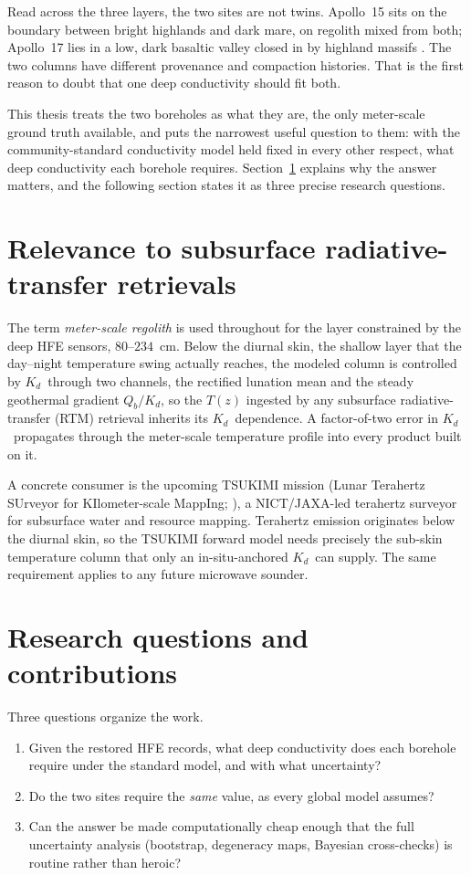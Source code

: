 \documentclass[11pt,a4paper,oneside]{report}
\newcommand{\Kd}{\ensuremath{K_d}}
\newcommand{\Qb}{\ensuremath{Q_b}}
\begin{document}
Read across the three layers, the two sites are not twins. Apollo~15
sits on the boundary between bright highlands and dark mare, on
regolith mixed from both; Apollo~17 lies in a low, dark basaltic
valley closed in by highland massifs
\citep{korotev2005,wieczorek2006,crawford2015}. The two columns have
different provenance and compaction histories. That is the first
reason to doubt that one deep conductivity should fit both.

This thesis treats the two boreholes as what they are, the only
meter-scale ground truth available, and puts the narrowest useful
question to them: with the community-standard conductivity model held
fixed in every other respect, what deep conductivity each borehole
requires. Section~\ref{sec:intro-tsukimi} explains why the answer
matters, and the following section states it as three precise
research questions.

\section{Relevance to subsurface radiative-transfer retrievals}\label{sec:intro-tsukimi}
The term \emph{meter-scale regolith} is used throughout for the layer
constrained by the deep HFE sensors, $80$--$234$~cm. Below the diurnal
skin, the shallow layer that the day--night temperature swing actually
reaches, the modeled column is controlled by \Kd\ through two channels,
the rectified lunation mean and the steady geothermal gradient
$\Qb/\Kd$, so the $T(z)$ ingested by any subsurface
radiative-transfer (RTM) retrieval inherits its \Kd\ dependence. A
factor-of-two error in \Kd\ propagates through the meter-scale
temperature profile into every product built on it.

A concrete consumer is the upcoming TSUKIMI mission (Lunar Terahertz
SUrveyor for KIlometer-scale MappIng; \citealp{tsukimi2022}), a
NICT/JAXA-led terahertz surveyor for subsurface water and resource
mapping. Terahertz emission originates below the diurnal skin, so the
TSUKIMI forward model needs precisely the sub-skin temperature column
that only an in-situ-anchored \Kd\ can supply. The same requirement
applies to any future microwave sounder.

\section{Research questions and contributions}
Three questions organize the work.
\begin{enumerate}
  \item Given the restored HFE records, what deep conductivity does
    each borehole require under the standard \citet{hayne2017} model,
    and with what uncertainty?
  \item Do the two sites require the \emph{same} value, as every
    global model assumes?
  \item Can the answer be made computationally cheap enough that the
    full uncertainty analysis (bootstrap, degeneracy maps, Bayesian
    cross-checks) is routine rather than heroic?
\end{enumerate}
\end{document}
